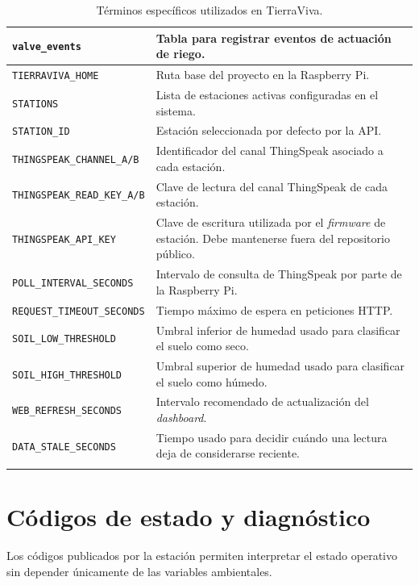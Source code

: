 \begin{longtable}{|p{}|p{}|}
\hline
\texttt{valve\_events} & Tabla para registrar eventos de actuación de riego. \\
\hline
\texttt{TIERRAVIVA\_HOME} & Ruta base del proyecto en la Raspberry Pi. \\
\hline
\texttt{STATIONS} & Lista de estaciones activas configuradas en el sistema. \\
\hline
\texttt{STATION\_ID} & Estación seleccionada por defecto por la API. \\
\hline
\texttt{THINGSPEAK\_CHANNEL\_A/B} & Identificador del canal ThingSpeak asociado a cada estación. \\
\hline
\texttt{THINGSPEAK\_READ\_KEY\_A/B} & Clave de lectura del canal ThingSpeak de cada estación. \\
\hline
\texttt{THINGSPEAK\_API\_KEY} & Clave de escritura utilizada por el \textit{firmware} de estación. Debe mantenerse fuera del repositorio público. \\
\hline
\texttt{POLL\_INTERVAL\_SECONDS} & Intervalo de consulta de ThingSpeak por parte de la Raspberry Pi. \\
\hline
\texttt{REQUEST\_TIMEOUT\_SECONDS} & Tiempo máximo de espera en peticiones HTTP. \\
\hline
\texttt{SOIL\_LOW\_THRESHOLD} & Umbral inferior de humedad usado para clasificar el suelo como seco. \\
\hline
\texttt{SOIL\_HIGH\_THRESHOLD} & Umbral superior de humedad usado para clasificar el suelo como húmedo. \\
\hline
\texttt{WEB\_REFRESH\_SECONDS} & Intervalo recomendado de actualización del \textit{dashboard}. \\
\hline
\texttt{DATA\_STALE\_SECONDS} & Tiempo usado para decidir cuándo una lectura deja de considerarse reciente. \\
\hline
\caption{Términos específicos utilizados en TierraViva.}
\label{tab:terminos_especificos_tierraviva}
\end{longtable}

\normalsize

\section{Códigos de estado y diagnóstico}

Los códigos publicados por la estación permiten interpretar el estado operativo sin depender únicamente de las variables ambientales.

